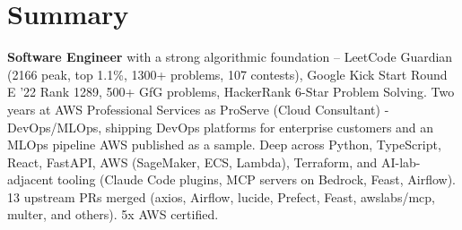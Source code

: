 \section{\textbf{Summary}}
\vspace{1pt}
\small{\textbf{Software Engineer} with a strong algorithmic foundation -- LeetCode Guardian (2166 peak, top 1.1\%, 1300+ problems, 107 contests), Google Kick Start Round E '22 Rank 1289, 500+ GfG problems, HackerRank 6-Star Problem Solving. Two years at AWS Professional Services as ProServe (Cloud Consultant) - DevOps/MLOps, shipping DevOps platforms for enterprise customers and an MLOps pipeline AWS published as a sample. Deep across Python, TypeScript, React, FastAPI, AWS (SageMaker, ECS, Lambda), Terraform, and AI-lab-adjacent tooling (Claude Code plugins, MCP servers on Bedrock, Feast, Airflow). 13 upstream PRs merged (axios, Airflow, lucide, Prefect, Feast, awslabs/mcp, multer, and others). 5x AWS certified.}
\vspace{-2mm}
